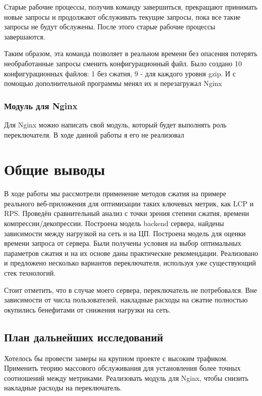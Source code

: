 \documentclass[12pt]{article}
\begin{document}
Старые рабочие процессы, получив команду завершиться, прекращают принимать новые запросы и продолжают обслуживать текущие запросы, пока все такие запросы не будут обслужены. После этого старые рабочие процессы завершаются.

Таким образом, эта команда позволяет в реальном времени без опасения потерять необработанные запросы сменить конфигурационный файл. Было создано 10 конфигурационных файлов: 1 без сжатия, 9 - для каждого уровня gzip. И с помощью дополнительной
программы менял их и перезагружал Nginx

\subsubsection{Модуль для Nginx}

Для Nginx можно написать свой модуль, который будет выполнять роль переключателя. В ходе данной работы я его не реализовал

\section{Общие выводы}

В ходе работы мы рассмотрели применение методов сжатия на примере реального веб-приложения для оптимизации таких ключевых метрик, как LCP и RPS.
Проведён сравнительный анализ с точки зрения степени сжатия, времени компрессии/декопрессии. Построена модель backend сервера,
найдены зависимости между нагрузкой на сеть и на ЦП. Построена модель для оценки времени запроса от сервера.
Были получены условия на выбор оптимальных параметров сжатия и на их основе даны практические рекомендации.
Реализовано и предложено несколько вариантов переключателя, используя уже существующий стек технологий.

Стоит отметить, что в случае моего сервера, переключатель не потребовался. Вне зависимости от числа пользователей,
накладные расходы на сжатие полностью окупились бенефитами от снижения нагрузки на сеть.

\subsection{План дальнейших исследований}

Хотелось бы провести замеры на крупном проекте с высоким трафиком. Применить теорию массового обслуживания для установления более точных
соотношений между метриками. Реализовать модуль для Nginx, чтобы снизить накладные расходы на переключатель.
\end{document}
